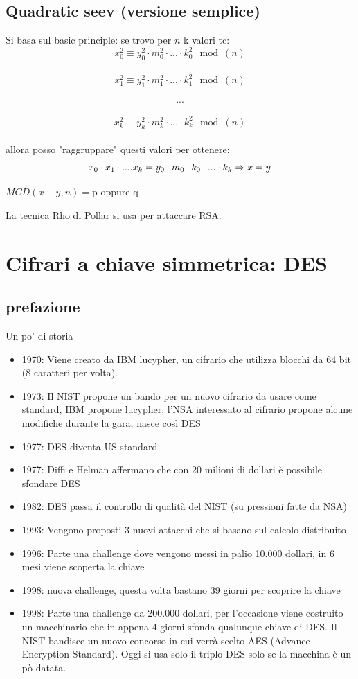 \documentclass[10pt,a4paper]{article}
\begin{document}
\subsection{Quadratic seev (versione semplice)}
Si basa sul basic principle: se trovo per $n$ k valori tc:\\
$$x_0^2\equiv y_0^2\cdot m_0^2 \cdot ... \cdot k_0^2 \mod(n)$$ \\
$$x_1^2\equiv y_1^2\cdot m_1^2 \cdot ... \cdot k_1^2 \mod(n)$$ \\
$$...$$\\
$$x_k^2\equiv y_k^2\cdot m_k^2 \cdot ... \cdot k_k^2 \mod(n)$$ \\
allora posso "raggruppare" questi valori per ottenere:
$$
x_0\cdot x_1 \cdot .... x_k = y_0 \cdot m_0 \cdot k_0 \cdot ... \cdot k_k\\
\Rightarrow \\
x = y\\
$$
\begin{center}
$MCD(x-y,n)=$p oppure q
\end{center}

La tecnica Rho di Pollar si usa per attaccare RSA.
\newpage
\section{Cifrari a chiave simmetrica: DES}
\subsection{prefazione}
Un po' di storia
\begin{itemize}
\item 1970: Viene creato da IBM lucypher, un cifrario che utilizza blocchi da 64 bit (8 caratteri per volta).
\item 1973: Il NIST propone un bando per un nuovo cifrario da usare come standard, IBM propone lucypher, l'NSA interessato al cifrario propone alcune modifiche durante la gara, nasce così DES
\item 1977: DES diventa US standard
\item 1977: Diffi e Helman affermano che con 20 milioni di dollari è possibile sfondare DES
\item 1982: DES passa il controllo di qualità del NIST (su pressioni fatte da NSA)
\item 1993: Vengono proposti 3 nuovi attacchi che si basano sul calcolo distribuito
\item 1996: Parte una challenge dove vengono messi in palio 10.000 dollari, in 6 mesi viene scoperta la chiave
\item 1998: nuova challenge, questa volta bastano 39 giorni per scoprire la chiave
\item 1998: Parte una challenge da 200.000 dollari, per l'occasione viene costruito un macchinario che in appena 4 giorni sfonda qualunque chiave di DES. Il NIST bandisce un nuovo concorso in cui verrà scelto AES (Advance Encryption Standard). Oggi si usa solo il triplo DES solo se la macchina è un pò datata.

\end{itemize}
\end{document}
